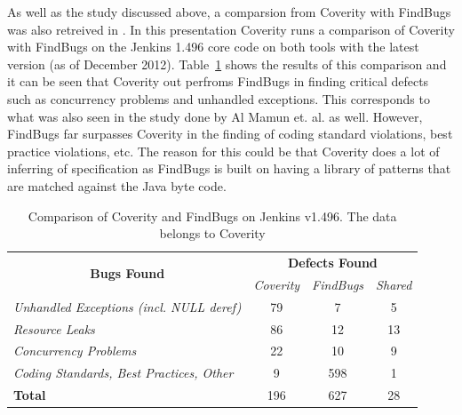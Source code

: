 \documentclass[10pt,oneside]{IEEEtran}
\begin{document}
As well as the study discussed above, a comparsion from Coverity with FindBugs was also retreived in \cite{12}. In this presentation Coverity runs a comparison of Coverity with FindBugs on the Jenkins 1.496 core code on both tools with the latest version (as of December 2012). Table~\ref{tbl:coverityCompare} shows the results of this comparison and it can be seen that Coverity out perfroms FindBugs in finding critical defects such as concurrency problems and unhandled exceptions. This corresponds to what was also seen in the study done by Al Mamun et. al. as well. However, FindBugs far surpasses Coverity in the finding of coding standard violations, best practice violations, etc. The reason for this could be that Coverity does a lot of inferring of specification as FindBugs is built on having a library of patterns that are matched against the Java byte code.

\begin{table}[ht]
\centering
\caption{Comparison of Coverity and FindBugs on Jenkins v1.496. The data belongs to Coverity}
\label{tbl:coverityCompare}
\def\arraystretch{1.5}%
\begin{tabular}{|l|ccc|}
\hline
\multicolumn{1}{|c|}{\multirow{2}{*}{{\bf Bugs Found}}} & \multicolumn{3}{c|}{{\bf Defects Found}}       \\ \cline{2-4}
\multicolumn{1}{|c|}{}                                  & {\it Coverity} & {\it FindBugs} & {\it Shared} \\ \hline
{\it Unhandled Exceptions (incl. NULL deref)}           & 79             & 7              & 5            \\ \hline
{\it Resource Leaks}                                    & 86             & 12             & 13           \\ \hline
{\it Concurrency Problems}                              & 22             & 10             & 9            \\ \hline
{\it Coding Standards, Best Practices, Other}           & 9              & 598            & 1            \\ \hline
{\bf Total}                                             & 196            & 627            & 28           \\ \hline
\end{tabular}
\end{table}
\end{document}
